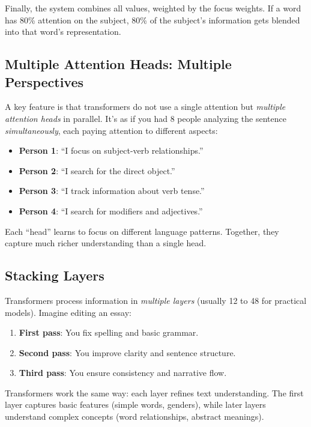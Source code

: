 \documentclass[11pt,a4paper]{article}
\begin{document}
Finally, the system combines all values, weighted by the focus weights. If a word has 80\% attention on the subject, 80\% of the subject's information gets blended into that word's representation.

\subsection{Multiple Attention Heads: Multiple Perspectives}

A key feature is that transformers do not use a single attention but \emph{multiple attention heads} in parallel. It's as if you had 8 people analyzing the sentence \emph{simultaneously}, each paying attention to different aspects:

\begin{itemize}[leftmargin=*]
    \item \textbf{Person 1}: ``I focus on subject-verb relationships.''
    \item \textbf{Person 2}: ``I search for the direct object.''
    \item \textbf{Person 3}: ``I track information about verb tense.''
    \item \textbf{Person 4}: ``I search for modifiers and adjectives.''
\end{itemize}

Each ``head'' learns to focus on different language patterns. Together, they capture much richer understanding than a single head.

\subsection{Stacking Layers}

Transformers process information in \emph{multiple layers} (usually 12 to 48 for practical models). Imagine editing an essay:
\begin{enumerate}[leftmargin=*]
    \item \textbf{First pass}: You fix spelling and basic grammar.
    \item \textbf{Second pass}: You improve clarity and sentence structure.
    \item \textbf{Third pass}: You ensure consistency and narrative flow.
\end{enumerate}

Transformers work the same way: each layer refines text understanding. The first layer captures basic features (simple words, genders), while later layers understand complex concepts (word relationships, abstract meanings).
\end{document}
